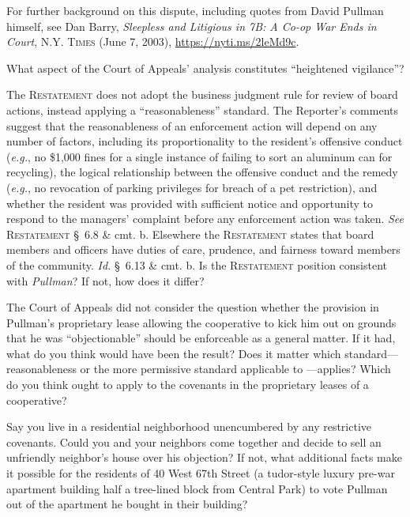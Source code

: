 
\item For further background on this dispute, including quotes from David
Pullman himself, see Dan Barry, \textit{Sleepless and Litigious in 7B: A Co-op
War Ends in Court}, \textsc{N.Y. Times} (June 7, 2003),
\url{https://nyti.ms/2leMd9c}.

\item What aspect of the Court of Appeals' analysis constitutes ``heightened
vigilance''?

\item The \textsc{Restatement} does not adopt the business judgment rule for
review of
board actions, instead applying a ``reasonableness'' standard. The Reporter's
comments suggest that the reasonableness of an enforcement action will depend on
any number of factors, including its proportionality to the resident's offensive
conduct (\textit{e.g.}, no \$1,000 fines for a single instance of failing to
sort an aluminum can for recycling), the logical relationship between the
offensive conduct and the remedy (\textit{e.g.}, no revocation of parking
privileges for breach of a pet restriction), and whether the resident was
provided with sufficient notice and opportunity to respond to the managers'
complaint before any enforcement action was taken. \textit{See}
\textsc{Restatement} \S~6.8 \& cmt. b. Elsewhere the \textsc{Restatement} states
that
board members and officers have duties of care, prudence, and fairness toward
members of the community. \textit{Id.} \S~6.13 \& cmt. b. Is the
\textsc{Restatement}
position consistent with \textit{Pullman}? If not, how does it differ?

\item The Court of Appeals did not consider the question whether the provision
in Pullman's proprietary lease allowing the cooperative to kick him out on
grounds that he was ``objectionable'' should be enforceable as a general matter.
If it had, what do you think would have been the result? Does it matter which
standard---reasonableness or the more permissive standard applicable to
---applies? Which do you think ought to apply to the covenants in
the proprietary leases of a cooperative?

\item Say you live in a residential neighborhood unencumbered by any restrictive
covenants. Could you and your neighbors come together and decide to sell an
unfriendly neighbor's house over his objection? If not, what additional facts
make it possible for the residents of 40 West 67th Street (a tudor-style luxury
pre-war apartment building half a tree-lined block from Central Park) to vote
Pullman out of the apartment he bought in their building?

